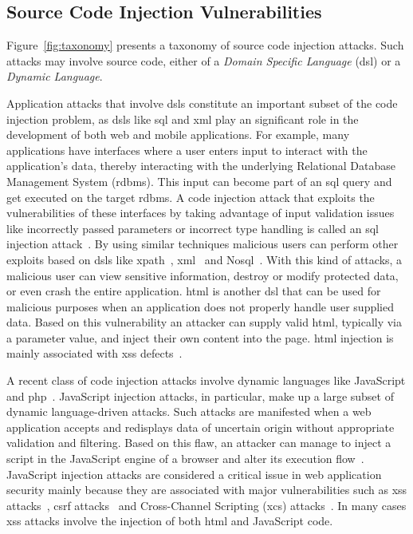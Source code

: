 \documentclass[conference]{IEEEtran}
\begin{document}
\subsection{Source Code Injection Vulnerabilities}

Figure~\ref{fig:taxonomy} presents a taxonomy of source
code injection attacks. Such attacks may involve source code, either of a
{\it Domain Specific Language} ({\sc dsl}) or a {\it Dynamic Language}.

Application attacks that involve {\sc dsl}s constitute an important
subset of the code injection problem, as {\sc dsl}s like {\sc sql} and
{\sc xml} play an significant role in the development of both web and
mobile applications. For example, many applications have interfaces
where a user enters input to interact with the application's data,
thereby interacting with the underlying Relational Database Management
System ({\sc rdbms}). This input can become part of an {\sc sql} query
and get executed on the target {\sc rdbms}. A code injection attack that
exploits the vulnerabilities of these interfaces by taking advantage
of input validation issues like incorrectly passed parameters or
incorrect type handling is called an {\sc sql} injection
attack~\cite{CERT02,MS09,HVO06,SW06}. By using similar techniques
malicious users can perform other exploits based on {\sc dsl}s
like {\sc xp}ath~\cite{SW06,CDL07,MKS09}, {\sc xml}~\cite{MSM13}
and No{\sc sql}~\cite{SMS13}. With this kind of attacks,
a malicious user can view sensitive information,
destroy or modify protected data, or even crash the entire
application. {\sc html} is another {\sc dsl} that can be used
for malicious purposes when an application does not properly
handle user supplied data. Based on this vulnerability
an attacker can supply valid {\sc html},
typically via a parameter value, and inject their own
content into the page. {\sc html} injection is mainly associated
with {\sc xss} defects~\cite{HNSHS12}.

A recent class of code injection attacks involve dynamic languages
like JavaScript and {\sc php}~\cite{SFVM09,EWKK09,SMS13}. JavaScript
injection attacks, in particular, make up a large subset of dynamic
language-driven attacks. Such attacks are manifested when a web
application accepts and redisplays data of uncertain origin without
appropriate validation and filtering. Based on this flaw, an attacker
can manage to inject a script in the JavaScript engine of a browser
and alter its execution flow~\cite{ELX07}. JavaScript injection
attacks are considered a critical issue in web application security
mainly because they are associated with major vulnerabilities such as
{\sc xss} attacks~\cite{SG07}, {\sc csrf} attacks~\cite{BJM08,LZRL09}
and Cross-Channel Scripting ({\sc xcs}) attacks~\cite{W10,BBB09}. In
many cases {\sc xss} attacks involve the injection of both {\sc html}
and JavaScript code.
\end{document}
